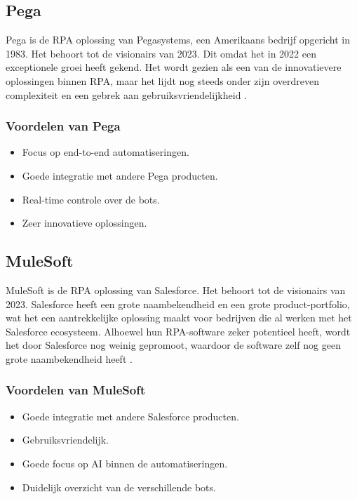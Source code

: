 \subsection{Pega}
\label{subsec:pegasystems}

Pega is de RPA oplossing van Pegasystems, een Amerikaans bedrijf opgericht in 1983. Het behoort tot de visionairs van 2023. Dit omdat het in 2022 een exceptionele groei heeft gekend. Het wordt gezien als een van de innovatievere oplossingen binnen RPA, maar het lijdt nog steeds onder zijn overdreven complexiteit en een gebrek aan gebruiksvriendelijkheid \autocite{GartnerPega2024}.

\subsubsection{Voordelen van Pega}

\begin{itemize}
    \item Focus op end-to-end automatiseringen.
    \item Goede integratie met andere Pega producten.
    \item Real-time controle over de bots.
    \item Zeer innovatieve oplossingen.
\end{itemize}

\subsection{MuleSoft}

MuleSoft is de RPA oplossing van Salesforce. Het behoort tot de visionairs van 2023. Salesforce heeft een grote naambekendheid en een grote product-portfolio, wat het een aantrekkelijke oplossing maakt voor bedrijven die al werken met het Salesforce ecosysteem. Alhoewel hun RPA-software zeker potentieel heeft, wordt het door Salesforce nog weinig gepromoot, waardoor de software zelf nog geen grote naambekendheid heeft \autocite{GartnerSalesforceMulesoft2024}. 

\subsubsection{Voordelen van MuleSoft}

\begin{itemize}
    \item Goede integratie met andere Salesforce producten.
    \item Gebruiksvriendelijk.
    \item Goede focus op AI binnen de automatiseringen.
    \item Duidelijk overzicht van de verschillende bots.
\end{itemize}

